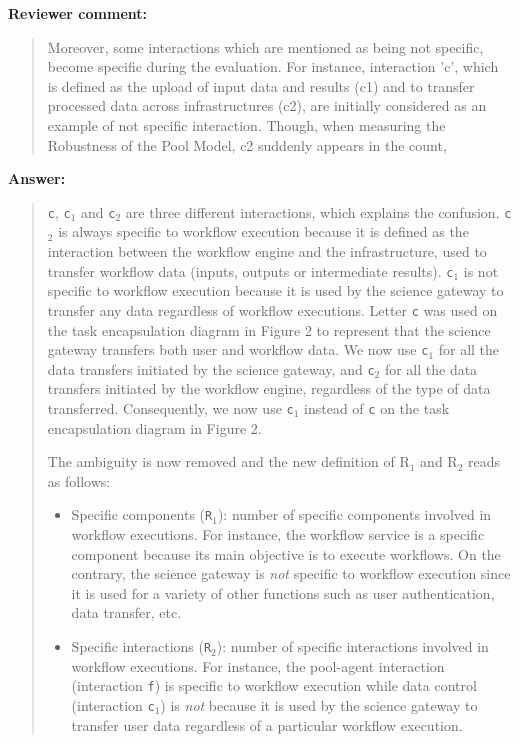 \documentclass[a4]{article}
\newenvironment{review}%
{\textbf{Reviewer comment:}\begin{quote}}%
{\end{quote}}%
\newenvironment{answer}%
{\textbf{Answer:}\begin{small}\begin{quote}}%
{\end{quote}\end{small}}%
\newcommand{\revised}[1]{\color{blue} #1\color{black}\xspace}
\begin{document}
\begin{review}
Moreover, some
  interactions which are mentioned as being not specific, become
  specific during the evaluation. For instance, interaction 'c', which
  is defined as the upload of input data and results (c1) and to
  transfer processed data across infrastructures (c2), are initially
  considered as an example of not specific interaction. Though, when
  measuring the Robustness of the Pool Model, c2 suddenly appears in
  the count, 
\end{review}

\begin{answer}
\texttt{c}, \texttt{c$_1$} and \texttt{c$_2$} are three different
interactions, which explains the confusion. \texttt{c$_2$} is always
specific to workflow execution because it is defined as the
interaction between the workflow engine and the infrastructure, used
to transfer workflow data (inputs, outputs or intermediate
results). \texttt{c$_1$} is not specific to workflow execution because
it is used by the science gateway to transfer any data regardless of
workflow executions. Letter \texttt{c} was used on the task
encapsulation diagram in Figure 2 to represent that the science gateway transfers
both user and workflow data. We now use \texttt{c$_1$} for all the
data transfers initiated by the science gateway, and \texttt{c$_2$}
for all the data transfers initiated by the workflow engine,
regardless of the type of data transferred. Consequently, we now use
\texttt{c$_1$} instead of \texttt{c} on the task encapsulation diagram in Figure 2.

The ambiguity is now removed and the new definition of R$_1$ and R$_2$ reads as follows:

\begin{itemize}
\item Specific components (\texttt{R$_1$}): number of specific components involved in workflow executions. \revised{For instance, the
  workflow service is a specific component because its main objective
  is to execute workflows. On the contrary, the science gateway is
  \emph{not} specific to workflow execution since it is used for a
  variety of other functions such as user authentication, data
  transfer, etc.}
\item Specific interactions (\texttt{R$_2$}): number of specific
  interactions involved in workflow executions. \revised{For
    instance, the pool-agent interaction (interaction \texttt{f}) is
    specific to workflow execution while data control (interaction
    \texttt{c$_1$}) is \emph{not} because it is used by the science gateway to transfer
    user data regardless of a particular workflow execution}.
\end{itemize}
\end{answer}
\end{document}
